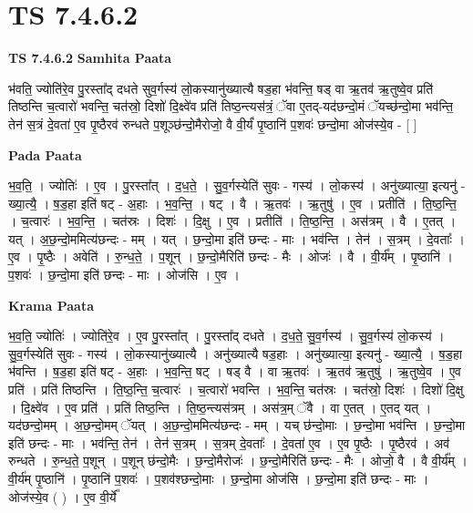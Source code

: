 \documentclass[17pt]{extarticle}
\begin{document}
\section{ TS 7.4.6.2 }

\textbf{TS 7.4.6.2 } \newline
\textbf{Samhita Paata} \newline

भ॑वति॒ ज्योति॑रे॒व पु॒रस्ता᳚द् दधते सुव॒र्गस्य॑ लो॒कस्यानु॑ख्यात्यै षड॒हा भ॑वन्ति॒ षड् वा ऋ॒तव॑ ऋ॒तुष्वे॒व प्रति॑ तिष्ठन्ति च॒त्वारो॑ भवन्ति॒ चत॑स्रो॒ दिशो॑ दि॒क्ष्वे॑व प्रति॑ तिष्ठ॒न्त्यस॑त्रं॒ ॅवा ए॒तद्-यद॑छन्दो॒मं ॅयच्छ॑न्दो॒मा भव॑न्ति॒ तेन॑ स॒त्रं दे॒वता॑ ए॒व पृ॒ष्ठैरव॑ रुन्धते प॒शूञ्छ॑न्दो॒मैरोजो॒ वै वी॒र्यं॑ पृ॒ष्ठानि॑ प॒शवः॑ छन्दो॒मा ओज॑स्ये॒व - [  ] \newline

\textbf{Pada Paata} \newline

भ॒व॒ति॒ । ज्योतिः॑ । ए॒व । पु॒रस्ता᳚त् । द॒ध॒ते॒ । सु॒व॒र्गस्येति॑ सुवः - गस्य॑ । लो॒कस्य॑ । अनु॑ख्यात्या॒ इत्यनु॑ - ख्या॒त्यै॒ । ष॒ड॒हा इति॑ षट् - अ॒हाः । भ॒व॒न्ति॒ । षट् । वै । ऋ॒तवः॑ । ऋ॒तुषु॑ । ए॒व । प्रतीति॑ । ति॒ष्ठ॒न्ति॒ । च॒त्वारः॑ । भ॒व॒न्ति॒ । चत॑स्रः । दिशः॑ । दि॒क्षु । ए॒व । प्रतीति॑ । ति॒ष्ठ॒न्ति॒ । अस॑त्रम् । वै । ए॒तत् । यत् । अ॒छ॒न्दो॒ममित्य॑छन्दः - मम् । यत् । छ॒न्दो॒मा इति॑ छन्दः - माः । भव॑न्ति । तेन॑ । स॒त्रम् । दे॒वताः᳚ । ए॒व । पृ॒ष्ठैः । अवेति॑ । रु॒न्ध॒ते॒ । प॒शून् । छ॒न्दो॒मैरिति॑ छन्दः - मैः । ओजः॑ । वै । वी॒र्य᳚म् । पृ॒ष्ठानि॑ । प॒शवः॑ । छ॒न्दो॒मा इति॑ छन्दः - माः । ओज॑सि । ए॒व ।  \newline


\textbf{Krama Paata} \newline

भ॒व॒ति॒ ज्योतिः॑ । ज्योति॑रे॒व । ए॒व पु॒रस्ता᳚त् । पु॒रस्ता᳚द् दधते । द॒ध॒ते॒ सु॒व॒र्गस्य॑ । सु॒व॒र्गस्य॑ लो॒कस्य॑ । सु॒व॒र्गस्येति॑ सुवः - गस्य॑ । लो॒कस्यानु॑ख्यात्यै । अनु॑ख्यात्यै षड॒हाः । अनु॑ख्यात्या॒ इत्यनु॑ - ख्या॒त्यै॒ । ष॒ड॒हा भ॑वन्ति । ष॒ड॒हा इति॑ षट् - अ॒हाः । भ॒व॒न्ति॒ षट् । षड् वै । वा ऋ॒तवः॑ । ऋ॒तव॑ ऋ॒तुषु॑ । ऋ॒तुष्वे॒व । ए॒व प्रति॑ । प्रति॑ तिष्ठन्ति । ति॒ष्ठ॒न्ति॒ च॒त्वारः॑ । च॒त्वारो॑ भवन्ति । भ॒व॒न्ति॒ चत॑स्रः । चत॑स्रो॒ दिशः॑ । दिशो॑ दि॒क्षु । दि॒क्ष्वे॑व । ए॒व प्रति॑ । प्रति॑ तिष्ठ॒न्ति । ति॒ष्ठ॒न्त्यस॑त्रम् । अस॑त्र॒म् ॅवै । वा ए॒तत् । ए॒तद् यत् । यद॑छन्दो॒मम् । अ॒छ॒न्दो॒मम् ॅयत् । अ॒छ॒न्दो॒ममित्य॑छन्दः - मम् । यच् छ॑न्दो॒माः । छ॒न्दो॒मा भव॑न्ति । छ॒न्दो॒मा इति॑ छन्दः - माः । भव॑न्ति॒ तेन॑ । तेन॑ स॒त्रम् । स॒त्रम् दे॒वताः᳚ । दे॒वता॑ ए॒व । ए॒व पृ॒ष्ठैः । पृ॒ष्ठैरव॑ । अव॑ रुन्धते । रु॒न्ध॒ते॒ प॒शून् । प॒शून् छ॑न्दो॒मैः । छ॒न्दो॒मैरोजः॑ । छ॒न्दो॒मैरिति॑ छन्दः - मैः । ओजो॒ वै । वै वी॒र्य᳚म् । वी॒र्य॑म् पृ॒ष्ठानि॑ । पृ॒ष्ठानि॑ प॒शवः॑ । प॒शव॑श्छन्दो॒माः । छ॒न्दो॒मा ओज॑सि । छ॒न्दो॒मा इति॑ छन्दः - माः । ओज॑स्ये॒व ( ) । ए॒व वी॒र्ये᳚ \newline
\end{document}
